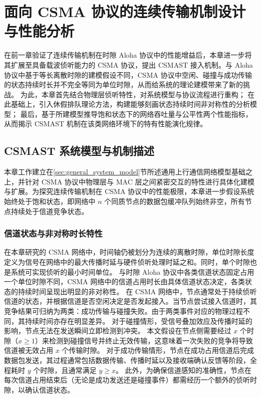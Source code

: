 \chapter{面向 CSMA 协议的连续传输机制设计与性能分析}
\label{chapter4:CSMAST}

在前一章验证了连续传输机制在时隙 Aloha 协议中的性能增益后，本章进一步将其扩展至具备载波侦听能力的 CSMA 协议，提出 CSMAST 接入机制。与 Aloha 协议中基于等长离散时隙的建模假设不同，CSMA 协议中空闲、碰撞与成功传输的状态持续时长并不完全等同为单位时隙，从而给系统的理论建模带来了新的挑战。
为此，本章首先结合物理层侦听特性，对系统模型与协议流程进行重构；
在此基础上，引入休假排队理论方法，构建能够刻画状态持续时间非对称性的分析模型；
最后，基于所建模型推导饱和状态下的网络吞吐量与公平性两个性能指标，从而揭示 CSMAST 机制在该类网络环境下的特有性能演化规律。

\section{CSMAST 系统模型与机制描述}
\label{sec:csmast_system_model}

本章工作建立在\ref{sec:general_system_model}节所述通用上行通信网络模型基础之上，并针对 CSMA 协议中物理层与 MAC 层之间紧密交互的特性进行具体化建模与扩展。为探究连续传输机制在 CSMA 协议中的性能极限，本章进一步假设系统始终处于饱和状态，即网络中 $n$ 个同质节点的数据包缓冲队列始终非空，所有节点持续处于信道竞争状态。

\subsection{信道状态与非对称时长特性}

在本章研究的 CSMA 网络中，时间轴仍被划分为连续的离散时隙，单位时隙长度定义为信号在网络中的最大传播时延与硬件侦听处理时延之和。同时，单个时隙也是系统可实现侦听的最小时间单位。
与时隙 Aloha 协议中各类信道状态固定占用一个单位时隙不同，CSMA 网络中的信道占用时长由具体信道状态决定，各类状态的持续时间呈现出明显的非对称性。
在 CSMA 网络中，节点通常处于持续侦听信道的状态，并根据信道是否空闲决定是否发起接入。当节点尝试接入信道时，其竞争结果可归纳为两类：成功传输与碰撞失败。由于两类事件对应的物理过程不同，其持续时间亦存在明显差异。
对于碰撞情形，受信号叠加效应及传播时延的影响，节点无法在发送瞬间立即检测到冲突。
本文假设在节点侧需要经过 $x$ 个时隙（$x \ge 1$）来检测到碰撞信号并终止无效传输，这意味着一次失败的竞争将导致信道被无效占用 $x$ 个传输时隙。
对于成功传输情形，节点在成功占用信道后完成数据包发送，其过程通常包括数据传输、传播时延以及接收端确认反馈等阶段，全程耗时 $y$ 个时隙，且通常满足 $y \ge x$。
此外，为确保信道感知的准确性，节点在每次信道占用结束后（无论是成功发送还是碰撞事件）都需经历一个额外的侦听时隙，以确认信道状态。

